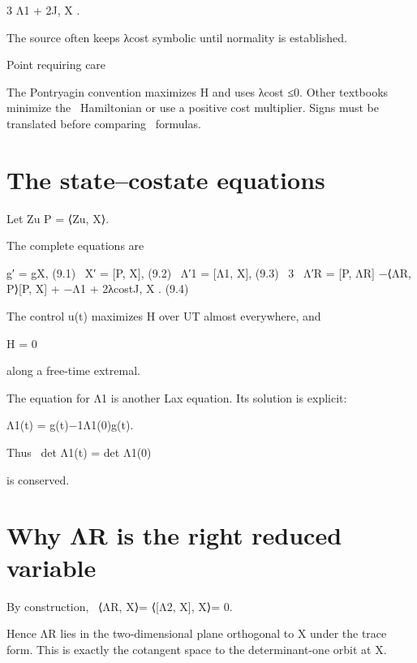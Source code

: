 3 Λ1 + 2J, X .


The source often keeps λcost symbolic until normality is established.


\begin{insightbox}{Point requiring care}
\end{insightbox}

\begin{displaytext}
The Pontryagin convention maximizes H and uses λcost ≤0. Other textbooks minimize the \
Hamiltonian or use a positive cost multiplier. Signs must be translated before comparing \
formulas.
\end{displaytext}

\section{The state–costate equations}

Let Zu P = ⟨Zu, X⟩.


The complete equations are


\begin{displaytext}
g′ = gX, (9.1) \
X′ = [P, X], (9.2) \
Λ′1 = [Λ1, X], (9.3) \
3 \
Λ′R = [P, ΛR] −⟨ΛR, P⟩[P, X] + −Λ1 + 2λcostJ, X . (9.4)
\end{displaytext}

The control u(t) maximizes H over UT almost everywhere, and


H = 0


along a free-time extremal.


The equation for Λ1 is another Lax equation. Its solution is explicit:


\begin{displaytext}
Λ1(t) = g(t)−1Λ1(0)g(t).
\end{displaytext}

\begin{displaytext}
Thus \
det Λ1(t) = det Λ1(0)
\end{displaytext}

is conserved.


\section{Why ΛR is the right reduced variable}

\begin{displaytext}
By construction, \
⟨ΛR, X⟩= ⟨[Λ2, X], X⟩= 0.
\end{displaytext}

Hence ΛR lies in the two-dimensional plane orthogonal to X under the trace form. This is exactly the cotangent space to the determinant-one orbit at X.


